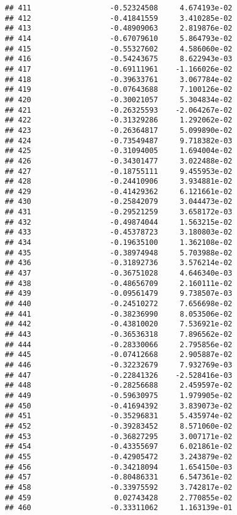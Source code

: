 \documentclass[
]{article}
\begin{document}
\begin{verbatim}
## 411                  -0.52324508     4.674193e-02
## 412                  -0.41841559     3.410285e-02
## 413                  -0.48909063     2.819876e-02
## 414                  -0.67079610     5.864793e-02
## 415                  -0.55327602     4.586060e-02
## 416                  -0.54243675     8.622943e-03
## 417                  -0.69111961    -1.166026e-02
## 418                  -0.39633761     3.067784e-02
## 419                  -0.07643688     7.100126e-02
## 420                  -0.30021057     5.304834e-02
## 421                  -0.26325593    -2.064267e-02
## 422                  -0.31329286     1.292062e-02
## 423                  -0.26364817     5.099890e-02
## 424                  -0.73549487     9.718382e-03
## 425                  -0.31094005     1.694004e-02
## 426                  -0.34301477     3.022488e-02
## 427                  -0.18755111     9.455953e-02
## 428                  -0.24410906     3.934881e-02
## 429                  -0.41429362     6.121661e-02
## 430                  -0.25842079     3.044473e-02
## 431                  -0.29521259     3.658172e-03
## 432                  -0.49874044     1.563215e-02
## 433                  -0.45378723     3.180803e-02
## 434                  -0.19635100     1.362108e-02
## 435                  -0.38974948     5.703988e-02
## 436                  -0.31892736     3.576214e-02
## 437                  -0.36751028     4.646340e-03
## 438                  -0.48656709     2.160111e-02
## 439                  -0.09561479     9.738507e-03
## 440                  -0.24510272     7.656698e-02
## 441                  -0.38236990     8.053506e-02
## 442                  -0.43810020     7.536921e-02
## 443                  -0.36536318     7.896562e-02
## 444                  -0.28330066     2.795856e-02
## 445                  -0.07412668     2.905887e-02
## 446                  -0.32232679     7.932769e-03
## 447                  -0.22841326    -2.528416e-03
## 448                  -0.28256688     2.459597e-02
## 449                  -0.59630975     1.979905e-02
## 450                  -0.41694392     3.839073e-02
## 451                  -0.35296831     5.435974e-02
## 452                  -0.39283452     8.571060e-02
## 453                  -0.36827295     3.007171e-02
## 454                  -0.43355697     6.021861e-02
## 455                  -0.42905472     3.243879e-02
## 456                  -0.34218094     1.654150e-03
## 457                  -0.80486331     6.547361e-02
## 458                  -0.33975592     3.742817e-02
## 459                   0.02743428     2.770855e-02
## 460                  -0.33311062     1.163139e-01

\end{verbatim}
\end{document}
